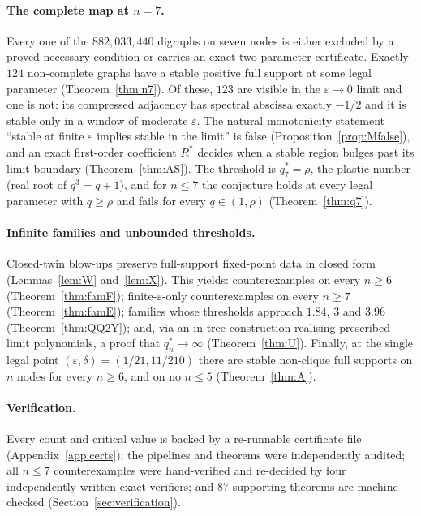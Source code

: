 \documentclass[11pt]{article}
\theoremstyle{definition}
\newcommand{\eps}{\varepsilon}
\begin{document}
\paragraph{The complete map at $n=7$.} Every one of the $882{,}033{,}440$ digraphs on seven nodes is either
excluded by a proved necessary condition or carries an exact two-parameter certificate. Exactly $124$
non-complete graphs have a stable positive full support at some legal parameter
(Theorem~\ref{thm:n7}). Of these, $123$ are visible in the $\eps\to0$ limit and one is not: its
compressed adjacency has spectral abscissa exactly $-1/2$ and it is stable only in a window of moderate
$\eps$. The natural monotonicity statement ``stable at finite $\eps$ implies stable in the limit'' is
false (Proposition~\ref{prop:Mfalse}), and an exact first-order coefficient $R^*$ decides when a stable
region bulges past its limit boundary (Theorem~\ref{thm:AS}). The threshold is $q_7^*=\rho$, the plastic
number (real root of $q^3=q+1$), and for $n\le7$ the conjecture holds at every legal parameter with
$q\ge\rho$ and fails for every $q\in(1,\rho)$ (Theorem~\ref{thm:q7}).

\paragraph{Infinite families and unbounded thresholds.} Closed-twin blow-ups preserve full-support
fixed-point data in closed form (Lemmas~\ref{lem:W} and~\ref{lem:X}). This yields: counterexamples on
every $n\ge6$ (Theorem~\ref{thm:famF}); finite-$\eps$-only counterexamples on every $n\ge7$
(Theorem~\ref{thm:famE}); families whose thresholds approach $1.84$, $3$ and $3.96$
(Theorem~\ref{thm:QQ2Y}); and, via an in-tree construction realising prescribed limit polynomials, a proof
that $q_n^*\to\infty$ (Theorem~\ref{thm:U}). Finally, at the single legal point
$(\eps,\delta)=(1/21,11/210)$ there are stable non-clique full supports on $n$ nodes for every
$n\ge6$, and on no $n\le5$ (Theorem~\ref{thm:A}).

\paragraph{Verification.} Every count and critical value is backed by a re-runnable certificate file
(Appendix~\ref{app:certs}); the pipelines and theorems were independently audited; all $n\le7$ counterexamples were
hand-verified and re-decided by four independently written exact verifiers; and $87$ supporting theorems are machine-checked
(Section~\ref{sec:verification}).
\end{document}
